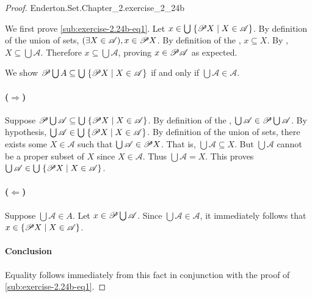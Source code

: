\documentclass{report}
\begin{document}
\begin{proof}

    {Enderton.Set.Chapter\_2.exercise\_2\_24b}

  We first prove \eqref{sub:exercise-2.24b-eq1}.
  Let $x \in \bigcup\; \{ \mathscr{P}X \mid X \in \mathscr{A} \}$.
  By definition of the union of sets,
    $(\exists X \in \mathscr{A}), x \in \mathscr{P}X$.
  By definition of the , $x \subseteq X$.
  By , $X \subseteq \bigcup \mathscr{A}$.
  Therefore $x \subseteq \bigcup \mathscr{A}$, proving
    $x \in \mathscr{P}\mathscr{A}$ as expected.

  \suitdivider

  \noindent
  We show $\mathscr{P}\bigcup A \subseteq 
    \bigcup\;\{ \mathscr{P}X \mid X \in \mathscr{A} \}$ if and only if
    $\bigcup\mathscr{A} \in \mathscr{A}$.

  \paragraph{($\Rightarrow$)}%

    Suppose $\mathscr{P}\bigcup\mathscr{A} \subseteq
      \bigcup\;\{ \mathscr{P}X \mid X \in \mathscr{A} \}$.
    By definition of the ,
      $\bigcup\mathscr{A} \in \mathscr{P}\bigcup\mathscr{A}$.
    By hypothesis, $\bigcup\mathscr{A} \in 
      \bigcup\;\{ \mathscr{P}X \mid X \in \mathscr{A} \}$.
    By definition of the union of sets, there exists some $X \in \mathscr{A}$
      such that $\bigcup\mathscr{A} \in \mathscr{P}X$.
    That is, $\bigcup\mathscr{A} \subseteq X$.
    But $\bigcup\mathscr{A}$ cannot be a proper subset of $X$ since
      $X \in \mathscr{A}$.
    Thus $\bigcup\mathscr{A} = X$.
    This proves $\bigcup\mathscr{A} \in
      \bigcup\;\{ \mathscr{P}X \mid X \in \mathscr{A} \}$.

  \paragraph{($\Leftarrow$)}%

    Suppose $\bigcup\mathscr{A} \in A$.
    Let $x \in \mathscr{P}\bigcup\mathscr{A}$.
    Since $\bigcup\mathscr{A} \in \mathscr{A}$, it immediately follows that
      $x \in \{\mathscr{P}X \mid X \in \mathscr{A}\}$.

  \paragraph{Conclusion}%

    Equality follows immediately from this fact in conjunction with the proof
      of \eqref{sub:exercise-2.24b-eq1}.

\end{proof}
\end{document}
